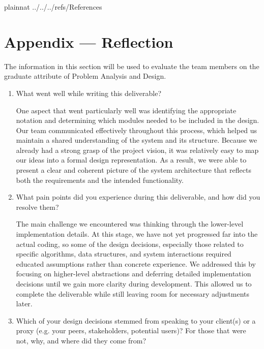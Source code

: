 \documentclass[12pt, titlepage]{article}
\begin{document}
\newpage

 {plainnat}
 {../../../refs/References}

\newpage



\section*{Appendix --- Reflection}

The information in this section will be used to evaluate the team members on the
graduate attribute of Problem Analysis and Design.


\begin{enumerate}
  \item What went well while writing this deliverable? 
  
    \hspace{2em} One aspect that went particularly well was identifying the appropriate notation and determining which modules needed to be included in the design. Our team communicated effectively throughout this process, which helped us maintain a shared understanding of the system and its structure. Because we already had a strong grasp of the project vision, it was relatively easy to map our ideas into a formal design representation. As a result, we were able to present a clear and coherent picture of the system architecture that reflects both the requirements and the intended functionality.

  \item What pain points did you experience during this deliverable, and how
    did you resolve them?

    \hspace{2em} The main challenge we encountered was thinking through the lower-level implementation details. At this stage, we have not yet progressed far into the actual coding, so some of the design decisions, especially those related to specific algorithms, data structures, and system interactions required educated assumptions rather than concrete experience. We addressed this by focusing on higher-level abstractions and deferring detailed implementation decisions until we gain more clarity during development. This allowed us to complete the deliverable while still leaving room for necessary adjustments later.

  \item Which of your design decisions stemmed from speaking to your client(s)
  or a proxy (e.g. your peers, stakeholders, potential users)? For those that
  were not, why, and where did they come from?


\end{enumerate}
\end{document}
